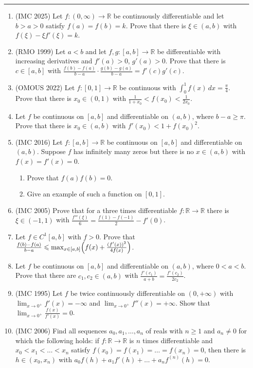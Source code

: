 \documentclass[11pt,a4paper]{article}
\renewcommand{\le}{\leqslant}
\renewcommand{\ge}{\geqslant}
\begin{document}
\noindent\rule{\textwidth}{0.4pt}\par\vspace{4pt}
\begin{enumerate}
\item (IMC 2025) Let $f\colon(0,\infty)\to\mathbb R$ be continuously differentiable and let $b>a>0$
satisfy $f(a)=f(b)=k$. Prove that there is $\xi\in(a,b)$ with $f(\xi)-\xi f'(\xi)=k$.

\item (RMO 1999) Let $a<b$ and let $f,g\colon[a,b]\to\mathbb R$ be differentiable with increasing
derivatives and $f'(a)>0$, $g'(a)>0$. Prove that there is $c\in[a,b]$ with
$\frac{f(b)-f(a)}{b-a}\cdot\frac{g(b)-g(a)}{b-a}=f'(c)g'(c)$.

\item (OMOUS 2022) Let $f\colon[0,1]\to\mathbb R$ be continuous with $\int_0^1f(x)\,dx=\frac\pi4$.
Prove that there is $x_0\in(0,1)$ with $\frac1{1+x_0}<f(x_0)<\frac1{2x_0}$.

\item Let $f$ be continuous on $[a,b]$ and differentiable on $(a,b)$, where $b-a\ge\pi$. Prove that
there is $x_0\in(a,b)$ with $f'(x_0)<1+f(x_0)^2$.

\item (IMC 2016) Let $f\colon[a,b]\to\mathbb R$ be continuous on $[a,b]$ and differentiable on
$(a,b)$. Suppose $f$ has infinitely many zeros but there is no $x\in(a,b)$ with $f(x)=f'(x)=0$.
\begin{enumerate}[label=\alph*)]
\item Prove that $f(a)f(b)=0$.
\item Give an example of such a function on $[0,1]$.
\end{enumerate}

\item (IMC 2005) Prove that for a three times differentiable $f\colon\mathbb R\to\mathbb R$ there is
$\xi\in(-1,1)$ with $\frac{f'''(\xi)}6=\frac{f(1)-f(-1)}2-f'(0)$.

\item Let $f\in C^1[a,b]$ with $f>0$. Prove that $\frac{f(b)-f(a)}{b-a}\le\max_{x\in[a,b]}\Bigl(f(x)+
\frac{(f'(x))^2}{4f(x)}\Bigr)$.

\item Let $f$ be continuous on $[a,b]$ and differentiable on $(a,b)$, where $0<a<b$. Prove that there
are $c_1,c_2\in(a,b)$ with $\frac{f'(c_1)}{a+b}=\frac{f'(c_2)}{2c_2}$.

\item (IMC 1995) Let $f$ be twice continuously differentiable on $(0,+\infty)$ with
$\lim_{x\to0^+}f'(x)=-\infty$ and $\lim_{x\to0^+}f''(x)=+\infty$. Show that
$\lim_{x\to0^+}\frac{f(x)}{f'(x)}=0$.

\item (IMC 2006) Find all sequences $a_0,a_1,\dots,a_n$ of reals with $n\ge1$ and $a_n\ne0$ for which
the following holds: if $f\colon\mathbb R\to\mathbb R$ is $n$ times differentiable and
$x_0<x_1<\dots<x_n$ satisfy $f(x_0)=f(x_1)=\dots=f(x_n)=0$, then there is $h\in(x_0,x_n)$ with
$a_0f(h)+a_1f'(h)+\dots+a_nf^{(n)}(h)=0$.
\end{enumerate}
\end{document}
